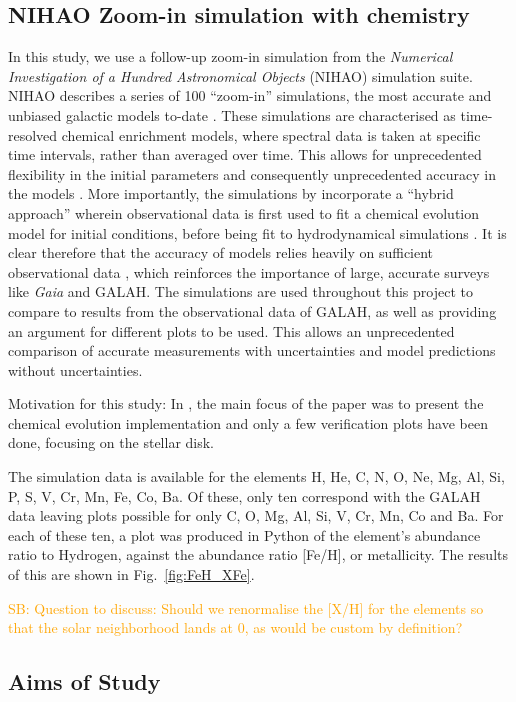 \documentclass[fleqn,usenatbib]{mnras}
\newcommand{\SB}[1]{{\textcolor{orange}{SB: #1}}}
\newcommand{\Gaia}{\textit{Gaia}\xspace} %
\begin{document}
\subsection{NIHAO Zoom-in simulation with chemistry}

In this study, we use a follow-up zoom-in simulation from the \textit{Numerical Investigation of a Hundred Astronomical Objects} (NIHAO) simulation suite. NIHAO describes a series of 100 “zoom-in” simulations, the most accurate and unbiased galactic models to-date \citep{Wang2015}. These simulations are characterised as time-resolved chemical enrichment models, where spectral data is taken at specific time intervals, rather than averaged over time. This allows for unprecedented flexibility in the initial parameters and consequently unprecedented accuracy in the models \citep{Buck2021}. 
More importantly, the simulations by \citet{Buck2021} incorporate a “hybrid approach” wherein observational data is first used to fit a chemical evolution model for initial conditions, before being fit to hydrodynamical simulations \citep{Buck2021}. It is clear therefore that the accuracy of models relies heavily on sufficient observational data \citep{Wang2015}, which reinforces the importance of large, accurate surveys like \Gaia and GALAH. The simulations are used throughout this project to compare to results from the observational data of GALAH, as well as providing an argument for different plots to be used. This allows an unprecedented comparison of accurate measurements with uncertainties and model predictions without uncertainties.

Motivation for this study: In \citet{Buck2021}, the main focus of the paper was to present the chemical evolution implementation and only a few verification plots have been done, focusing on the stellar disk.

The simulation data is available for the elements H, He, C, N, O, Ne, Mg, Al, Si, P, S, V, Cr, Mn, Fe, Co, Ba. Of these, only ten correspond with the GALAH data leaving plots possible for only C, O, Mg, Al, Si, V, Cr, Mn, Co and Ba. For each of these ten, a plot was produced in Python of the element's abundance ratio to Hydrogen, against the abundance ratio [Fe/H], or metallicity. The results of this are shown in Fig.~\ref{fig:FeH_XFe}.

\SB{Question to discuss: Should we renormalise the [X/H] for the elements so that the solar neighborhood lands at 0, as would be custom by definition?}

\subsection{Aims of Study} 
\end{document}
